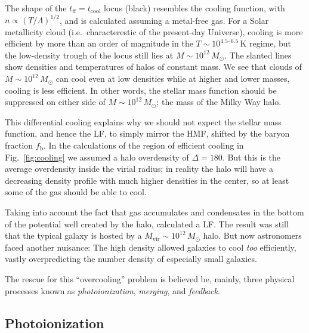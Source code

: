 \documentclass[useAMS,usenatbib,bibyear]{aa}
\begin{document}
The shape of the $t_\mathrm{ff} = t_\mathrm{cool}$ locus (black) resembles the cooling function, with $n\propto (T/\Lambda)^{1/2}$, and is calculated assuming a metal-free gas. For a Solar metallicity cloud (i.e.~characterestic of the present-day Universe), cooling is more efficient by more than an order of magnitude in the $T \sim 10^{4.5\text{--}6.5}\,\mathrm{K}$ regime, but the low-density trough of the locus still lies at $M\sim10^{12}\,M_\odot$.
The slanted lines show densities and temperatures of halos of constant mass. We see that clouds of $M\sim10^{12}\,M_\odot$ can cool even at low densities while at higher and lower masses, cooling is less efficient.
In other words, the stellar mass function should be suppressed on either side of $M\sim10^{12}\,M_\odot$; the mass of the Milky Way halo.

This differential cooling explains why we should not expect the stellar mass function, and hence the LF, to simply mirror the HMF, shifted by the baryon fraction $f_\mathrm{b}$.
In the calculations of the region of efficient cooling in Fig.~\ref{fig:cooling} we assumed a halo overdensity of $\Delta=180$.
But this is the average overdensity inside the virial radius;
in reality the halo will have a decreasing density profile with much higher densities in the center, so at least some of the gas should be able to cool.

Taking into account the fact that gas accumulates and condensates in the bottom of the potential well created by the halo, \citet{White1978} calculated a LF.
The result was still that the typical galaxy is hosted by a $M_\mathrm{vir}\sim10^{12}\,M_\odot$ halo.
But now astronomers faced another nuisance:
The high density allowed galaxies to cool \emph{too} efficiently, vastly overpredicting the number density of especially small galaxies.

The rescue for this ``overcooling'' problem is believed be, mainly, three physical processes known as \emph{photoionization}, \emph{merging}, and \emph{feedback}.

\subsection{Photoionization}
\label{sec:reionization}
\end{document}
